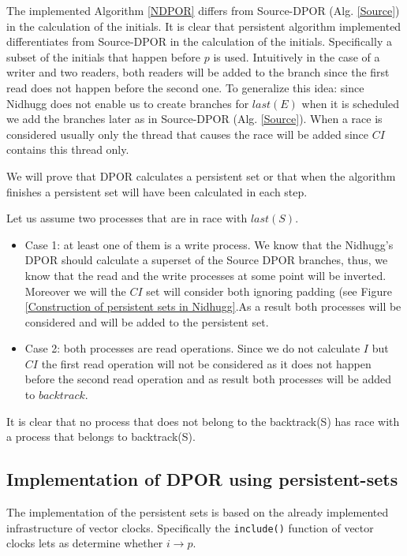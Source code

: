 The implemented Algorithm \ref{NDPOR} differs from Source-DPOR (Alg. \ref{Source}) in the calculation of the initials.
It is clear that persistent algorithm implemented differentiates from Source-DPOR in the calculation of the initials. 
Specifically a subset of the initials that happen before $p$ is used. 
Intuitively in the case of a writer and two readers, both readers will be added to the branch since the first read does not
happen before the second one.
To generalize this idea: since Nidhugg does not enable us to create branches for $last(E)$ when it is scheduled we add the 
branches later as in Source-DPOR (Alg. \ref{Source}). When a race is considered usually only the thread that causes the race will be added since 
$CI$ contains this thread only.

We will prove that DPOR calculates a persistent set or that when the algorithm finishes a persistent set will have been calculated in each step.

Let us assume two processes that are in race with $last(S)$.
\begin{itemize}

\item Case 1: at least one of them is a write process.
We know that the Nidhugg's DPOR should calculate a superset of the Source DPOR branches, thus, we know that the read and the write processes at some point
will be inverted. Moreover we will the $CI$ set will consider both ignoring padding (see Figure \ref{Construction of persistent sets in Nidhugg}.As a result both processes will be considered and will be added to the persistent set.


\item Case 2: both processes are read operations.
Since we do not calculate $I$ but $CI$ the first read operation will not be considered as it does not happen before the second read operation and as result
both processes will be added to $backtrack$. 

\end{itemize}
It is clear that no process that does not belong to the backtrack(S) has race with a process that belongs to backtrack(S).

\subsection{Implementation of DPOR using persistent-sets}

The implementation of the persistent sets is based on the already implemented infrastructure of vector clocks. Specifically the \verb|include()| function of vector clocks
lets as determine whether $i \rightarrow p$.

